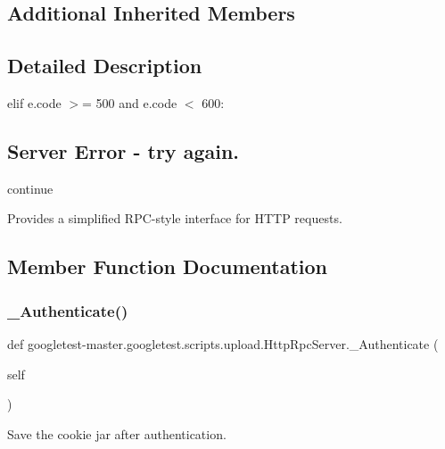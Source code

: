 \subsection*{Additional Inherited Members}


\subsection{Detailed Description}
elif e.\+code $>$= 500 and e.\+code $<$ 600\+: 

\subsection*{Server Error -\/ try again.}

continue \begin{DoxyVerb}Provides a simplified RPC-style interface for HTTP requests.\end{DoxyVerb}
 

\subsection{Member Function Documentation}
\mbox{\label{classgoogletest-master_1_1googletest_1_1scripts_1_1upload_1_1_http_rpc_server_a9b7c7d5f1d0af70343bc097c989e0e39}} 
\subsubsection{\texorpdfstring{\_Authenticate()}{\_Authenticate()}}
{\footnotesize\ttfamily def googletest-\/master.\+googletest.\+scripts.\+upload.\+Http\+Rpc\+Server.\+\_\+\+Authenticate (\begin{DoxyParamCaption}\item[{}]{self }\end{DoxyParamCaption})\hspace{0.3cm}{\ttfamily [private]}}

\begin{DoxyVerb}Save the cookie jar after authentication.\end{DoxyVerb}
 

